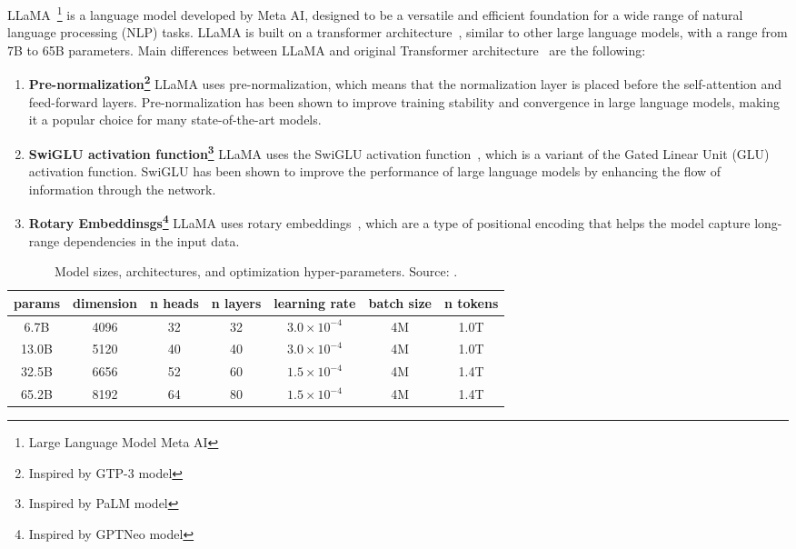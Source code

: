 LLaMA~\footnote{Large Language Model Meta AI} is a language model developed by Meta AI, designed to be a versatile and efficient foundation for a wide range of natural language processing (NLP) tasks.
LLaMA is built on a transformer architecture~\cite{vaswani2023attention}, similar to other large language models, with a range from 7B to 65B parameters.
Main differences between LLaMA and original Transformer architecture~\cite{vaswani2023attention} are the following:
\begin{enumerate}
    \item \textbf{Pre-normalization\footnote{Inspired by GTP-3 model}} {LLaMA uses pre-normalization, which means that the normalization layer is placed before the self-attention and feed-forward layers.
    Pre-normalization has been shown to improve training stability and convergence in large language models, making it a popular choice for many state-of-the-art models.
    }
    \item \textbf{SwiGLU activation function\footnote{Inspired by PaLM model}} {LLaMA uses the SwiGLU activation function~\cite{shazeer2020glu}, which is a variant of the Gated Linear Unit (GLU) activation function.
    SwiGLU has been shown to improve the performance of large language models by enhancing the flow of information through the network.
    }
    \item \textbf{Rotary Embeddinsgs\footnote{Inspired by GPTNeo model}} {LLaMA uses rotary embeddings~\cite{su2021roformer}, which are a type of positional encoding that helps the model capture long-range dependencies in the input data.
    }
\end{enumerate}

\begin{table}[ht]
    \centering
    \caption{Model sizes, architectures, and optimization hyper-parameters. Source: \protect\cite{touvron2023llama}. }
    \label{tab:llama-model-params}
    \begin{tabular}{@{}ccccccc@{}}
        \toprule
        params & dimension & n heads & n layers & learning rate          & batch size & n tokens \\
        \midrule
        6.7B     & 4096      & 32      & 32       & \(3.0 \times 10^{-4}\) & 4M         & 1.0T     \\
        13.0B    & 5120      & 40      & 40       & \(3.0 \times 10^{-4}\) & 4M         & 1.0T     \\
        32.5B    & 6656      & 52      & 60       & \(1.5 \times 10^{-4}\) & 4M         & 1.4T     \\
        65.2B    & 8192      & 64      & 80       & \(1.5 \times 10^{-4}\) & 4M         & 1.4T     \\
        \bottomrule
    \end{tabular}
\end{table}

